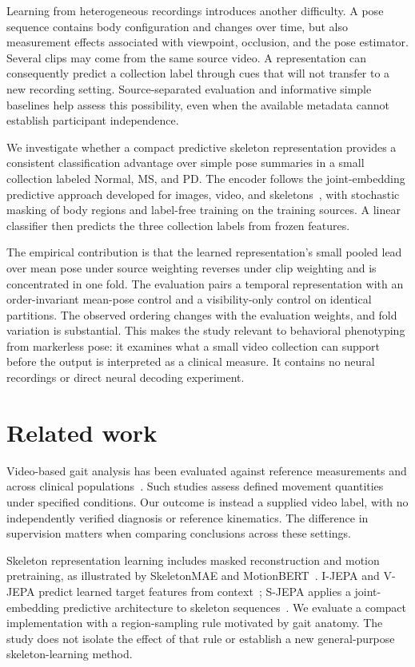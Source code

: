 \documentclass[10pt,twocolumn,letterpaper]{article}
\begin{document}
Learning from heterogeneous recordings introduces another difficulty. A pose sequence contains body configuration and changes over time, but also measurement effects associated with viewpoint, occlusion, and the pose estimator. Several clips may come from the same source video. A representation can consequently predict a collection label through cues that will not transfer to a new recording setting. Source-separated evaluation and informative simple baselines help assess this possibility, even when the available metadata cannot establish participant independence.

We investigate whether a compact predictive skeleton representation provides a consistent classification advantage over simple pose summaries in a small collection labeled Normal, MS, and PD. The encoder follows the joint-embedding predictive approach developed for images, video, and skeletons~\cite{ijepa,vjepa,sjepa}, with stochastic masking of body regions and label-free training on the training sources. A linear classifier then predicts the three collection labels from frozen features.

The empirical contribution is that the learned representation's small pooled lead over mean pose under source weighting reverses under clip weighting and is concentrated in one fold. The evaluation pairs a temporal representation with an order-invariant mean-pose control and a visibility-only control on identical partitions. The observed ordering changes with the evaluation weights, and fold variation is substantial. This makes the study relevant to behavioral phenotyping from markerless pose: it examines what a small video collection can support before the output is interpreted as a clinical measure. It contains no neural recordings or direct neural decoding experiment.

\section{Related work}
Video-based gait analysis has been evaluated against reference measurements and across clinical populations~\cite{stenum2021,stenum2024}. Such studies assess defined movement quantities under specified conditions. Our outcome is instead a supplied video label, with no independently verified diagnosis or reference kinematics. The difference in supervision matters when comparing conclusions across these settings.

Skeleton representation learning includes masked reconstruction and motion pretraining, as illustrated by SkeletonMAE and MotionBERT~\cite{skeletonmae,motionbert}. I-JEPA and V-JEPA predict learned target features from context~\cite{ijepa,vjepa}; S-JEPA applies a joint-embedding predictive architecture to skeleton sequences~\cite{sjepa}. We evaluate a compact implementation with a region-sampling rule motivated by gait anatomy. The study does not isolate the effect of that rule or establish a new general-purpose skeleton-learning method.
\end{document}
